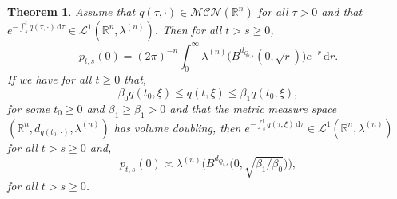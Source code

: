 \documentclass[a4paper, 12pt]{report}
\newtheorem{theorem}{Theorem}[section]
\theoremstyle{remark}
\theoremstyle{definition}
\begin{document}
\begin{theorem}\label{ThesisMainResult}
Assume that $q(\tau, \cdot) \in \mathcal{MCN}(\mathbb{R}^n)$ for all $\tau > 0$ and that $e^{-\int_s^t q(\tau, \cdot)\,\mathrm{d}\tau} \in \mathcal{L}^1(\mathbb{R}^n, \lambda^{(n)})$.  Then for all $t > s \ge 0$,
\begin{equation}
p_{t, s}(0) = (2\pi)^{-n}\int_0^\infty\lambda^{(n)}\big(B^{d_{Q_{t, s}}}(0, \sqrt{r})\big)e^{-r}\,\mathrm{d}r\label{DT}.
\end{equation}
If we have for all $t \ge 0$ that,
\begin{equation}\label{BetaBound}
\beta_0q(t_0, \xi) \le q(t, \xi) \le \beta_1q(t_0, \xi),
\end{equation}
for some $t_0 \ge 0$ and $\beta_1 \ge \beta_1 > 0$ and that the metric measure space $(\mathbb{R}^n, d_{q(t_0, \cdot)}, \lambda^{(n)})$ has volume doubling, then $e^{-\int_s^tq(\tau, \xi)\,\mathrm{d}\tau} \in \mathcal{L}^1(\mathbb{R}^n, \lambda^{(n)})$ for all $t > s \ge 0$ and,
\begin{equation}
p_{t, s}(0) \asymp \lambda^{(n)}\Big(B^{d_{Q_{t, s}}}\big(0, \sqrt{\beta_1/\beta_0}\big)\Big),
\end{equation}
for all $t > s \ge 0$.
\end{theorem}
\end{document}
